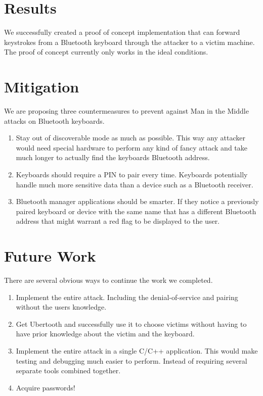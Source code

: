 \documentclass{acm_proc_article-sp}
\begin{document}
\section{Results}
We successfully created a proof of concept implementation that can forward keystrokes from a Bluetooth keyboard through the attacker to a victim machine. The proof of concept currently only works in the ideal conditions.

\section{Mitigation}
We are proposing three countermeasures to prevent against Man in the Middle attacks on Bluetooth keyboards.

\begin{enumerate}
\item Stay out of discoverable mode as much as possible. This way any attacker would need special hardware to perform any kind of fancy attack and take much longer to actually find the keyboards Bluetooth address.
\item Keyboards should require a PIN to pair every time. Keyboards potentially handle much more sensitive data than a device such as a Bluetooth receiver.
\item Bluetooth manager applications should be smarter. If they notice a previously paired keyboard or device with the same name that has a different Bluetooth address that might warrant a red flag to be displayed to the user.
\end{enumerate}

\section{Future Work}
There are several obvious ways to continue the work we completed. 

\begin{enumerate}
\item Implement the entire attack. Including the denial-of-service and pairing without the users knowledge.
\item Get Ubertooth and successfully use it to choose victims without having to have prior knowledge about the victim and the keyboard.
\item Implement the entire attack in a single C/C++ application. This would make testing and debugging much easier to perform. Instead of requiring several separate tools combined together.
\item Acquire passwords!
\end{enumerate}
\end{document}
